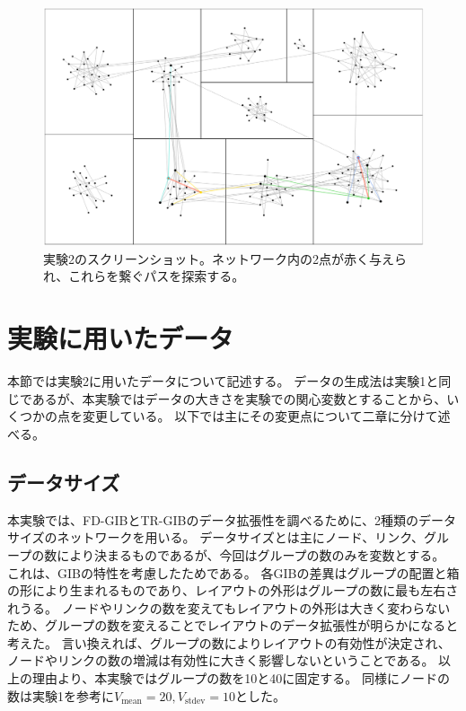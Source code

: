 \documentclass{kuee}
\begin{document}
\begin{figure}[t]
  \begin{center}
  \includegraphics[width=15cm]{./images/ex2-screenshot.png}
  \caption{実験2のスクリーンショット。ネットワーク内の2点が赤く与えられ、これらを繋ぐパスを探索する。}
  \label{fig:screenshot-ex2}
  \end{center}
\end{figure}

\section{実験に用いたデータ}
\label{sec:data_ex2}
本節では実験2に用いたデータについて記述する。
データの生成法は実験1と同じであるが、本実験ではデータの大きさを実験での関心変数とすることから、いくつかの点を変更している。
以下では主にその変更点について二章に分けて述べる。

\subsection{データサイズ}
\label{subsec:data_size}
本実験では、FD-GIBとTR-GIBのデータ拡張性を調べるために、2種類のデータサイズのネットワークを用いる。
データサイズとは主にノード、リンク、グループの数により決まるものであるが、今回はグループの数のみを変数とする。
これは、GIBの特性を考慮したためである。
各GIBの差異はグループの配置と箱の形により生まれるものであり、レイアウトの外形はグループの数に最も左右されうる。
ノードやリンクの数を変えてもレイアウトの外形は大きく変わらないため、グループの数を変えることでレイアウトのデータ拡張性が明らかになると考えた。
言い換えれば、グループの数によりレイアウトの有効性が決定され、ノードやリンクの数の増減は有効性に大きく影響しないということである。
以上の理由より、本実験ではグループの数を10と40に固定する。
同様にノードの数は実験1を参考に$V_{\text{mean}} = 20, V_{\text{stdev}} = 10$とした。
\end{document}
